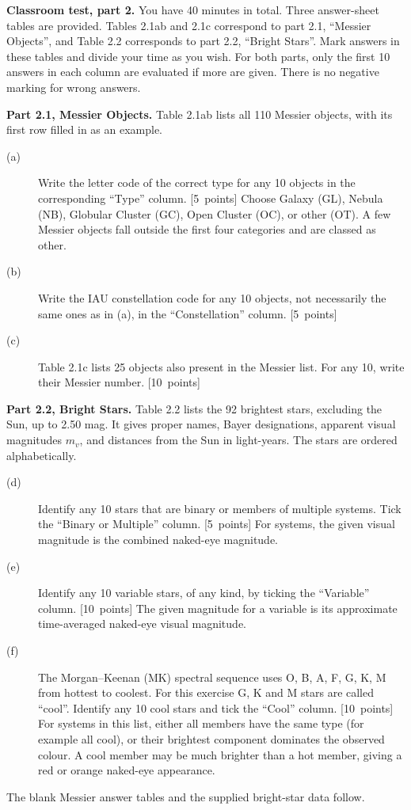 \textbf{Classroom test, part 2.} You have 40 minutes in total.
Three answer-sheet tables are provided. Tables 2.1ab and 2.1c correspond to part 2.1, ``Messier Objects'',
and Table 2.2 corresponds to part 2.2, ``Bright Stars''. Mark answers in these tables and divide your time as you wish.
For both parts, only the first 10 answers in each column are evaluated if more are given.
There is no negative marking for wrong answers.

\textbf{Part 2.1, Messier Objects.}
Table 2.1ab lists all 110 Messier objects, with its first row filled in as an example.
\begin{description}
\item[(a)] Write the letter code of the correct type for any 10 objects in the corresponding ``Type'' column. \hfill\mbox{[5 points]}
Choose Galaxy (GL), Nebula (NB), Globular Cluster (GC), Open Cluster (OC), or other (OT).
A few Messier objects fall outside the first four categories and are classed as other.
\item[(b)] Write the IAU constellation code for any 10 objects, not necessarily the same ones as in (a), in the ``Constellation'' column. \hfill\mbox{[5 points]}
\item[(c)] Table 2.1c lists 25 objects also present in the Messier list.
For any 10, write their Messier number. \hfill\mbox{[10 points]}
\end{description}
\textbf{Part 2.2, Bright Stars.}
Table 2.2 lists the 92 brightest stars, excluding the Sun, up to 2.50 mag. It gives proper names, Bayer
designations, apparent visual magnitudes $m_v$, and distances from the Sun in light-years. The stars are ordered alphabetically.
\begin{description}
\item[(d)] Identify any 10 stars that are binary or members of multiple systems.
Tick the ``Binary or Multiple'' column. \hfill\mbox{[5 points]}
For systems, the given visual magnitude is the combined naked-eye magnitude.
\item[(e)] Identify any 10 variable stars, of any kind, by ticking the ``Variable'' column. \hfill\mbox{[10 points]}
The given magnitude for a variable is its approximate time-averaged naked-eye visual magnitude.
\item[(f)] The Morgan--Keenan (MK) spectral sequence uses O, B, A, F, G, K, M from hottest to coolest.
For this exercise G, K and M stars are called ``cool''. Identify any 10 cool stars and tick the ``Cool'' column. \hfill\mbox{[10 points]}
For systems in this list, either all members have the same type (for example all cool), or their brightest
component dominates the observed colour. A cool member may be much brighter than a hot member, giving a red or orange naked-eye appearance.
\end{description}
The blank Messier answer tables and the supplied bright-star data follow.
